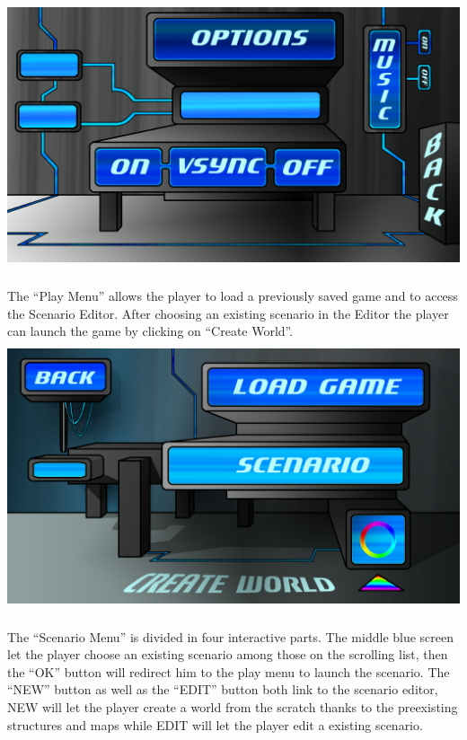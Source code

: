 \documentclass[article]{report}         %
\begin{document}
    \includegraphics[width=15cm, height=8cm]{images/Menus/Menu_Options_normal.png}

    The ``Play Menu'' allows the player to load a previously saved game and to access the Scenario Editor. After choosing an existing scenario in the Editor the player can launch the game by clicking on ``Create World''. \\

    \includegraphics[width=15cm, height=8cm]{images/Menus/menu_play_normal.png}

    \newpage

    The ``Scenario Menu'' is divided in four interactive parts. The middle blue screen let the player choose an existing scenario among those on the scrolling list, then the ``OK'' button will redirect him to the play menu to launch the scenario. The ``NEW'' button as well as the ``EDIT'' button both link to the scenario editor, NEW will let the player create a world from the scratch thanks to the preexisting structures and maps while EDIT will let the player edit a existing scenario.\\
\end{document}
